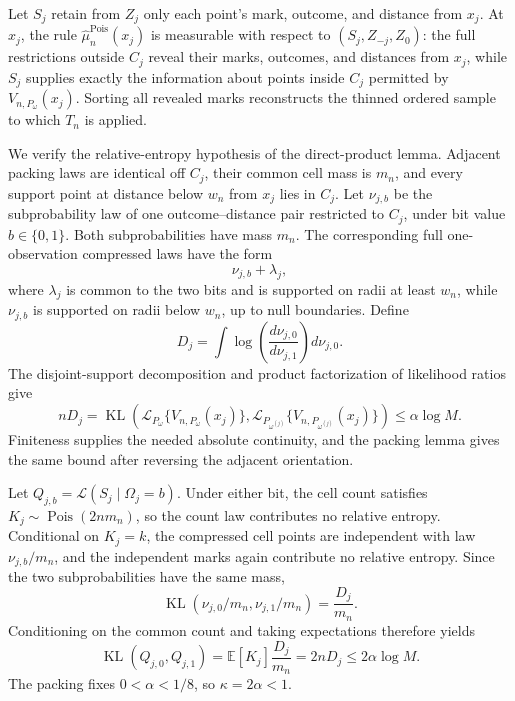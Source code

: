 Let \(S_j\) retain from \(Z_j\) only each point's mark, outcome, and distance from \(x_j\).  At \(x_j\), the rule \(\widehat\mu_n^{\mathrm{Pois}}(x_j)\) is measurable with respect to \((S_j,Z_{-j},Z_0)\): the full restrictions outside \(C_j\) reveal their marks, outcomes, and distances from \(x_j\), while \(S_j\) supplies exactly the information about points inside \(C_j\) permitted by \(V_{n,P_\omega}(x_j)\).  Sorting all revealed marks reconstructs the thinned ordered sample to which \(T_n\) is applied.

We verify the relative-entropy hypothesis of the direct-product lemma.  Adjacent packing laws are identical off \(C_j\), their common cell mass is \(m_n\), and every support point at distance below \(w_n\) from \(x_j\) lies in \(C_j\).  Let \(\nu_{j,b}\) be the subprobability law of one outcome--distance pair restricted to \(C_j\), under bit value \(b\in\{0,1\}\).  Both subprobabilities have mass \(m_n\).  The corresponding full one-observation compressed laws have the form
\[
 \nu_{j,b}+\lambda_j,
\]
where \(\lambda_j\) is common to the two bits and is supported on radii at least \(w_n\), while \(\nu_{j,b}\) is supported on radii below \(w_n\), up to null boundaries.  Define
\[
 D_j=\int\log\!\left(\frac{d\nu_{j,0}}{d\nu_{j,1}}\right)d\nu_{j,0}.
\]
The disjoint-support decomposition and product factorization of likelihood ratios give
\[
 nD_j
 =\operatorname{KL}\!\left(
 \mathcal L_{P_\omega}\{V_{n,P_\omega}(x_j)\},
 \mathcal L_{P_{\omega^{(j)}}}\{V_{n,P_{\omega^{(j)}}}(x_j)\}
 \right)
 \leq\alpha\log M.
\]
Finiteness supplies the needed absolute continuity, and the packing lemma gives the same bound after reversing the adjacent orientation.

Let \(Q_{j,b}=\mathcal L(S_j\mid\Omega_j=b)\).  Under either bit, the cell count satisfies \(K_j\sim\operatorname{Pois}(2nm_n)\), so the count law contributes no relative entropy.  Conditional on \(K_j=k\), the compressed cell points are independent with law \(\nu_{j,b}/m_n\), and the independent marks again contribute no relative entropy.  Since the two subprobabilities have the same mass,
\[
 \operatorname{KL}(\nu_{j,0}/m_n,\nu_{j,1}/m_n)=\frac{D_j}{m_n}.
\]
Conditioning on the common count and taking expectations therefore yields
\[
 \operatorname{KL}(Q_{j,0},Q_{j,1})
 =\mathbb E[K_j]\frac{D_j}{m_n}
 =2nD_j
 \leq2\alpha\log M.
\]
The packing fixes \(0<\alpha<1/8\), so \(\kappa=2\alpha<1\).


